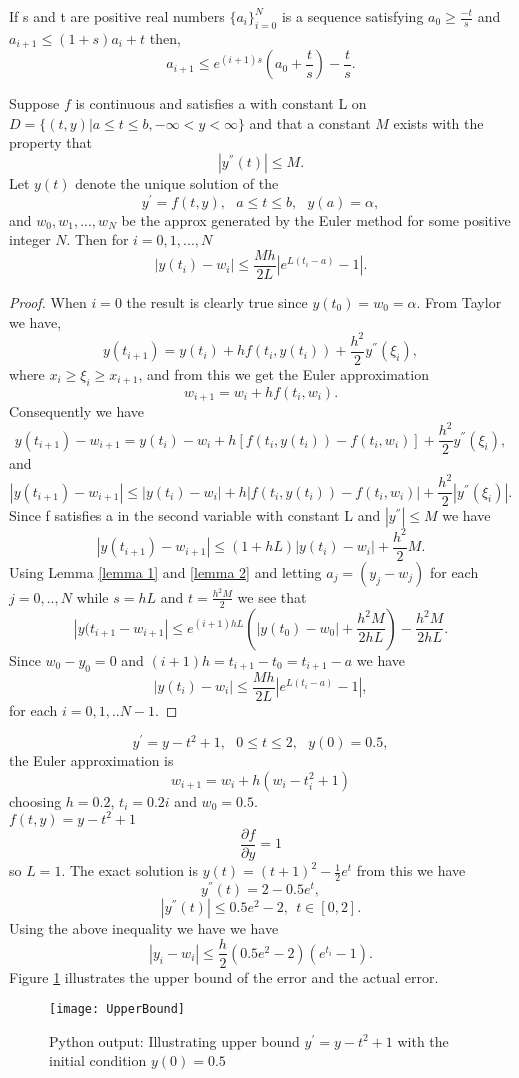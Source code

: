 \begin{lemma}
\label{lemma 2}
If s and t are positive real numbers $\{a_i\}_{i=0}^{N}$ is a sequence satisfying $\displaystyle a_0 \geq \frac{-t}{s}$ and $a_{i+1} \leq (1+s)a_i +t $
then,
\[a_{i+1} \leq e^{(i+1)s}\left(a_0+\frac{t}{s}\right)-\frac{t}{s}. \] 
\end{lemma}
\begin{theorem}
\label{Euler bound}
Suppose $f$ is continuous and satisfies a  with constant
L on $D=\{(t,y)|a\leq t \leq b, -\infty < y < \infty \}$ and that a constant $M$
exists with the property that 
\[ |y^{''}(t)|\leq M. \]
Let $y(t)$ denote the unique solution of the 
\[ y^{'}=f(t,y), \ \ \ a\leq t \leq b, \ \ \ y(a)=\alpha, \]
and $w_0,w_1,...,w_N$ be the approx generated by the Euler method for some
positive integer $N$.  Then for $i=0,1,...,N$
\[ |y(t_i)-w_i| \leq \frac{Mh}{2L}|e^{L(t_i-a)}-1|. \]
\end{theorem}
\begin{proof}
When $i=0$ the result is clearly true since $y(t_0)=w_0=\alpha$.
From Taylor we have,
\[y(t_{i+1})=y(t_i)+hf(t_i,y(t_i))+\frac{h^2}{2}y^{''}(\xi_i), \]
where $x_i \geq \xi_i \geq x_{i+1}$, and from this we get the Euler approximation
\[w_{i+1}=w_i + hf(t_i,w_i). \]
Consequently we have
\[y(t_{i+1})-w_{i+1}=y(t_i)-w_i+h[f(t_i,y(t_i))-f(t_i,w_i)]+\frac{h^2}{2}y^{''}(\xi_i), \]
and
\[|y(t_{i+1})-w_{i+1}|\leq |y(t_i)-w_i|+h|f(t_i,y(t_i))-f(t_i,w_i)|+\frac{h^2}{2}|y^{''}(\xi_i)|. \]
Since f satisfies a  in the second variable with constant L
and $|y^{''}|\leq M$ we have
\[|y(t_{i+1})-w_{i+1}|\leq (1+hL)|y(t_i)-w_i|+\frac{h^2}{2}M. \]
Using Lemma \ref{lemma 1} and \ref{lemma 2} and letting $a_j=(y_j-w_j)$ for each
$j=0,..,N$ while $s=hL$ and $t=\frac{h^2M}{2}$ we see that
\[|y(t_{i+1}-w_{i+1}|\leq e^{(i+1)hL}(|y(t_0)-w_0|+\frac{h^2M}{2hL}) -\frac{h^2M}{2hL}. \]
Since $w_0-y_0=0$ and $(i+1)h=t_{i+1}-t_0=t_{i+1}-a$ we have
\[ |y(t_i)-w_i| \leq \frac{Mh}{2L}|e^{L(t_i-a)}-1|, \]
for each $i=0,1,..N-1$.
\end{proof}
\begin{example}
\[y^{'}=y-t^2+1, \ \ \ 0 \leq t \leq 2, \ \ \ y(0)=0.5, \]
the Euler approximation is
\[w_{i+1} = w_i + h(w_i-t_i^2+1) \]
choosing $h=0.2$, $t_i=0.2i$ and $w_0=0.5$. \\
$f(t,y)=y-t^2+1$
\[\frac{\partial f}{\partial y}=1 \]
so $L=1$. The exact solution is $y(t)=(t+1)^2-\frac{1}{2}e^t$ from this we have
\[y^{''}(t) = 2-0.5e^t, \]
\[|y^{''}(t)| \leq 0.5e^2-2, \ \ t\in[0,2].\]
Using the above inequality we have we have
\[|y_i-w_i| \leq \frac{h}{2}(0.5e^2-2)(e^{t_i}-1).\]
Figure \ref{UpperBound Figure} illustrates the upper bound of the error and the actual error.

\begin{figure}[H]
\centering
\texttt{[image: UpperBound]}
\caption{Python output: Illustrating upper bound $y^{'}=y-t^2+1$ with the initial condition $y(0)=0.5$ }
\label{UpperBound Figure}
\end{figure}
\end{example}

